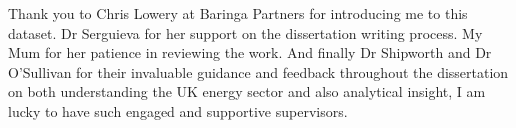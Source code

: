 \begin{acknowledgements}
Thank you to Chris Lowery at Baringa Partners for introducing me to this dataset. Dr Serguieva for her support on the dissertation writing process. My Mum for her patience in reviewing the work. And finally Dr Shipworth and Dr O'Sullivan for their invaluable guidance and feedback throughout the dissertation on both understanding the UK energy sector and also analytical insight, I am lucky to have such engaged and supportive supervisors. 
\end{acknowledgements}

\setcounter{tocdepth}{1} 

\tableofcontents
\listoffigures
\listoftables

